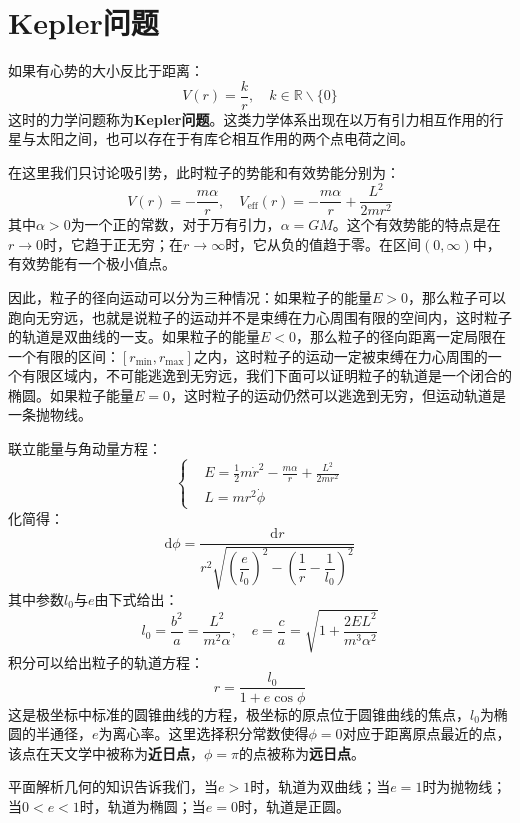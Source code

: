 \documentclass[a4paper,openany]{book}
\begin{document}
\chapter*{Kepler问题}

如果有心势的大小反比于距离：
\[
    V(r) = \frac{k}{r},\quad k \in \mathbb{R} \backslash \{0\}
\]
这时的力学问题称为\textbf{Kepler问题}。这类力学体系出现在以万有引力相互作用的行星与太阳之间，也可以存在于有库仑相互作用的两个点电荷之间。

在这里我们只讨论吸引势，此时粒子的势能和有效势能分别为：
\[
    V(r) = -\frac{m\alpha}{r},\quad V_{\mathrm{eff}}(r) = -\frac{m\alpha}{r} + \frac{L^2}{2mr^2}
\]
其中$\alpha > 0$为一个正的常数，对于万有引力，$\alpha = GM$。这个有效势能的特点是在$r \to 0$时，它趋于正无穷；在$r \to \infty$时，它从负的值趋于零。在区间$(0,\infty)$中，有效势能有一个极小值点。

因此，粒子的径向运动可以分为三种情况：如果粒子的能量$E>0$，那么粒子可以跑向无穷远，也就是说粒子的运动并不是束缚在力心周围有限的空间内，这时粒子的轨道是双曲线的一支。如果粒子的能量$E<0$，那么粒子的径向距离一定局限在一个有限的区间：$[r_{\mathrm{min}}, r_{\mathrm{max}}]$之内，这时粒子的运动一定被束缚在力心周围的一个有限区域内，不可能逃逸到无穷远，我们下面可以证明粒子的轨道是一个闭合的椭圆。如果粒子能量$E=0$，这时粒子的运动仍然可以逃逸到无穷，但运动轨道是一条抛物线。

联立能量与角动量方程：
\[
    \left\{
    \begin{aligned}
        & E = \frac{1}{2}m\dot{r}^2 - \frac{m\alpha}{r} + \frac{L^2}{2mr^2} \\
        & L = mr^2\dot{\phi}
    \end{aligned}
\right.
\]
化简得：
\[
    \mathrm{d}\phi = \frac{\mathrm{d}r}{r^2\sqrt{\left(\dfrac{e}{l_0}\right)^2 - \left(\dfrac{1}{r} - \dfrac{1}{l_0}\right)^2}}
\]
其中参数$l_0$与$e$由下式给出：
\[
    l_0 = \frac{b^2}{a} = \frac{L^2}{m^2\alpha},\quad e = \frac{c}{a} = \sqrt{1+\frac{2EL^2}{m^3\alpha^2}}
\]
积分可以给出粒子的轨道方程：
\[
    \boxed{r = \frac{l_0}{1+e\cos\phi}}
\]
这是极坐标中标准的圆锥曲线的方程，极坐标的原点位于圆锥曲线的焦点，$l_0$为椭圆的半通径，$e$为离心率。这里选择积分常数使得$\phi=0$对应于距离原点最近的点，该点在天文学中被称为\textbf{近日点}，$\phi=\pi$的点被称为\textbf{远日点}。

平面解析几何的知识告诉我们，当$e>1$时，轨道为双曲线；当$e=1$时为抛物线；当$0<e<1$时，轨道为椭圆；当$e=0$时，轨道是正圆。
\end{document}
